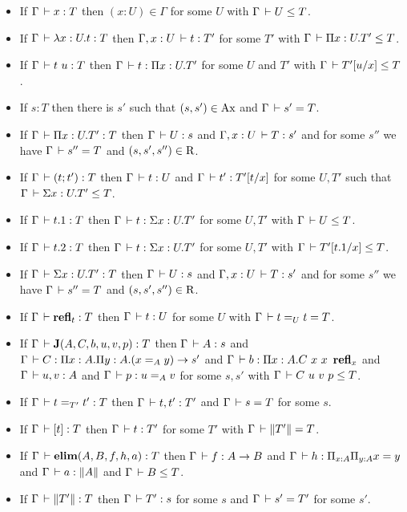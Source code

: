 \documentclass[a4paper,english]{lipics-utf8x}
\begin{document}
  \begin{lemma}[Inversion]
    \leavevmode
    \begin{itemize}
      \item If $\Gamma \,\vdash x : T$ then $(x:U) \in \Gamma$ for some
      $U$ with $\Gamma \,\vdash U \le T$.
      \item If $\Gamma \,\vdash \lambda x:U.t : T$ then $\Gamma, x:U \,\vdash t : T'$
      for some $T'$ with $\Gamma \,\vdash \Pi x:U.T' \le T$.
      \item If $\Gamma \,\vdash t\ u : T$ then $\Gamma \,\vdash t : \Pi x:U.T'$
      for some $U$ and $T'$ with $\Gamma \,\vdash T'[u/x] \le T$.
      \item If $s : T$ then there is $s'$ such that $(s,s') \in \operatorname{Ax}$
      and $\Gamma \,\vdash s' = T$.
      \item If $\Gamma \,\vdash \Pi x:U.T' : T$ then $\Gamma \,\vdash U : s$
      and $\Gamma, x:U \,\vdash T : s'$ and for some $s''$ we have
      $\Gamma \,\vdash s'' = T$ and $(s,s',s'') \in \operatorname{R}$.
      \item If $\Gamma \,\vdash (t ; t') : T$ then $\Gamma \,\vdash t : U$ and
      $\Gamma \,\vdash t' : T'[t/x]$ for some $U,T'$ such that
      $\Gamma \,\vdash \Sigma x:U.T' \le T$.
      \item If $\Gamma \,\vdash t.1 : T$ then $\Gamma \,\vdash t : \Sigma x:U.T'$
      for some $U,T'$ with $\Gamma \,\vdash U \le T$.
      \item If $\Gamma \,\vdash t.2 : T$ then $\Gamma \,\vdash t : \Sigma x:U.T'$
      for some $U,T'$ with $\Gamma \,\vdash T'[t.1/x] \le T$.
      \item If $\Gamma \,\vdash \Sigma x:U.T' : T$ then $\Gamma \,\vdash U : s$
      and $\Gamma, x:U \,\vdash T : s'$ and for some $s''$ we have
      $\Gamma \,\vdash s'' = T$ and $(s,s',s'') \in \operatorname{R}$.
      \item If $\Gamma \,\vdash \operatorname{\mathbf{refl}}_t : T$ then $\Gamma \,\vdash t : U$
      for some $U$ with $\Gamma \,\vdash t =_U t = T$.
      \item If $\Gamma \,\vdash \operatorname{\mathbf{J}}(A,C,b,u,v,p) : T$ then $\Gamma \,\vdash A : s$
      and $\Gamma \,\vdash C : \Pi x:A. \Pi y:A. (x =_A y) \to s'$ and
      $\Gamma \,\vdash b : \Pi x:A. C\ x\ x\ \operatorname{\mathbf{refl}}_x$ and $\Gamma \,\vdash u, v : A$
      and $\Gamma \,\vdash p : u =_A v$ for some $s,s'$ with
      $\Gamma \,\vdash C\ u\ v\ p \le T$.
      \item If $\Gamma \,\vdash t =_{T'} t' : T$ then $\Gamma \,\vdash t,t' : T'$
      and $\Gamma \,\vdash s = T$ for some $s$.
      \item If $\Gamma \,\vdash [t] : T$ then $\Gamma \,\vdash t : T'$ for some
      $T'$ with $\Gamma \,\vdash \|T'\| = T$.
      \item If $\Gamma \,\vdash \operatorname{\mathbf{elim}}(A,B,f,h,a) : T$ then
      $\Gamma \,\vdash f : A \to B$ and $\Gamma \,\vdash h : \Pi_{x:A} \Pi_{y:A} x = y$
      and $\Gamma \,\vdash a : \|A\|$ and $\Gamma \,\vdash B \le T$.
      \item If $\Gamma \,\vdash \|T'\| : T$ then $\Gamma \,\vdash T' : s$ for
      some $s$ and $\Gamma \,\vdash s' = T'$ for some $s'$.
    \end{itemize}
  \end{lemma}
\end{document}
